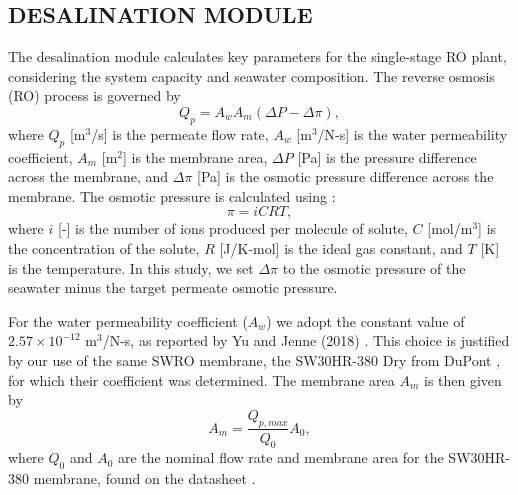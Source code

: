 \documentclass[twocolumn,10pt]{asme2e}
\begin{document}
\vspace{-1em}

\subsection{DESALINATION MODULE}
The desalination module calculates key parameters for the single-stage RO plant, considering the system capacity and seawater composition. The reverse osmosis (RO) process is governed by
\begin{equation}
    \label{eq:ro}
    Q_p = A_w A_m (\Delta P - \Delta \pi),
\end{equation}
\noindent where $Q_p$ [m$^3$/s] is the permeate flow rate, $A_w$ [m$^3$/N-s] is the water permeability coefficient, $A_m$ [m$^2$] is the membrane area, $\Delta P$ [Pa] is the pressure difference across the membrane, and $\Delta \pi$ [Pa] is the osmotic pressure difference across the membrane. The osmotic pressure is calculated using \cite{separationprocesses}:
\begin{equation}
    \label{eq:osmotic_pressure}
    \pi = iCRT,
\end{equation}
\noindent where $i$ [-] is the number of ions produced per molecule of solute, $C$ [mol/m$^3$] is the concentration of the solute, $R$ [J/K-mol] is the ideal gas constant, and $T$ [K] is the temperature. In this study, we set $\Delta \pi$ to the osmotic pressure of the seawater minus the target permeate osmotic pressure.


For the water permeability coefficient ($A_w$) we adopt the constant value of $2.57\times10^{-12}$ m$^3$/N-s, as reported by Yu and Jenne (2018) \cite{Yu2018}. This choice is justified by our use of the same SWRO membrane, the SW30HR-380 Dry from DuPont \cite{SW30HR380}, for which their coefficient was determined. The membrane area $A_m$ is then given by
\begin{equation}
    A_m = \frac{Q_{p,max}}{Q_0}A_0,
    \label{eq:membrane_area}
\end{equation}   
\noindent where $Q_0$ and $A_0$ are the nominal flow rate and membrane area for the SW30HR-380 membrane, found on the datasheet \cite{SW30HR380}.
\end{document}
